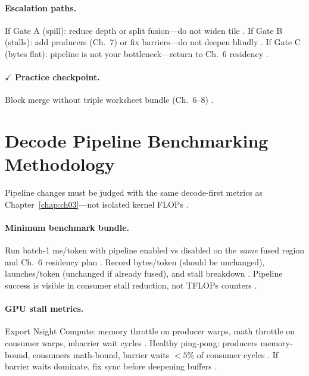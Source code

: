 \paragraph{Escalation paths.}
If Gate A (spill): reduce depth or split fusion---do not widen tile \citep{memoryfloor2026,yirage2026,dao2022flashattention}.
If Gate B (stalls): add producers (Ch.~7) or fix barriers---do not deepen blindly \citep{shah2024flashattention3,semianalysis2024tma}.
If Gate C (bytes flat): pipeline is not your bottleneck---return to Ch.~6 residency \citep{taxbreak2026,chen2020compilerbasedhardw,patel2025llminference}.

\paragraph{$\checkmark$ Practice checkpoint.}
Block merge without triple worksheet bundle (Ch.~6--8) \citep{yirage2026,chen2020compilerbasedhardw,taxbreak2026}.

\section{Decode Pipeline Benchmarking Methodology}
\label{sec:ch08_pipeline_benchmarking}

Pipeline changes must be judged with the same decode-first metrics as Chapter~\ref{chap:ch03}---not isolated kernel FLOPs \citep{patel2025llminference,kwon2023vllm,taxbreak2026}.

\paragraph{Minimum benchmark bundle.}
Run batch-1 ms/token with pipeline enabled vs disabled on the \emph{same} fused region and Ch.~6 residency plan \citep{yirage2026,dao2022flashattention,memoryfloor2026}.
Record bytes/token (should be unchanged), launches/token (unchanged if already fused), and stall breakdown \citep{taxbreak2026,shah2024flashattention3,chen2020compilerbasedhardw}.
Pipeline success is visible in consumer stall reduction, not TFLOPs counters \citep{patel2025llminference,semianalysis2024tma}.

\paragraph{GPU stall metrics.}
Export Nsight Compute: memory throttle on producer warps, math throttle on consumer warps, mbarrier wait cycles \citep{shah2024flashattention3,nvidia2022hopper,yirage2026}.
Healthy ping-pong: producers memory-bound, consumers math-bound, barrier waits ${\lt}5\%$ of consumer cycles \citep{semianalysis2024tma,memoryfloor2026,taxbreak2026}.
If barrier waits dominate, fix sync before deepening buffers \citep{patel2025llminference,chen2020compilerbasedhardw}.

